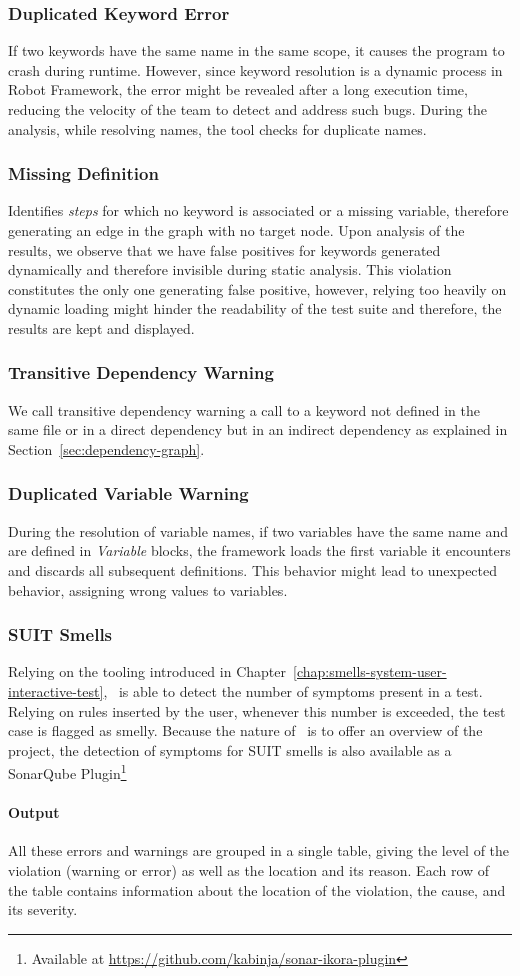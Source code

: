 \subsubsection{Duplicated Keyword Error} If two keywords have the same name in the same scope, it causes the program to crash during runtime. However, since keyword resolution is a dynamic process in Robot Framework, the error might be revealed after a long execution time, reducing the velocity of the team to detect and address such bugs. During the analysis, while resolving names, the tool checks for duplicate names.

\subsubsection{Missing Definition} Identifies \emph{steps} for which no keyword is associated or a missing variable, therefore generating an edge in the graph with no target node. Upon analysis of the results, we observe that we have false positives for keywords generated dynamically and therefore invisible during static analysis. This violation constitutes the only one generating false positive, however, relying too heavily on dynamic loading might hinder the readability of the test suite and therefore, the results are kept and displayed.

\subsubsection{Transitive Dependency Warning} We call transitive dependency warning a call to a keyword not defined in the same file or in a direct dependency but in an indirect dependency as explained in Section~\ref{sec:dependency-graph}.

\subsubsection{Duplicated Variable Warning} During the resolution of variable names, if two variables have the same name and are defined in \emph{Variable} blocks, the framework loads the first variable it encounters and discards all subsequent definitions. This behavior might lead to unexpected behavior, assigning wrong values to variables.

\subsubsection{SUIT Smells} Relying on the tooling introduced in Chapter~\ref{chap:smells-system-user-interactive-test}, \tool\ is able to detect the number of symptoms present in a test. Relying on rules inserted by the user, whenever this number is exceeded, the test case is flagged as smelly. Because the nature of \tool\ is to offer an overview of the project, the detection of symptoms for SUIT smells is also available as a SonarQube Plugin\footnote{Available at \url{https://github.com/kabinja/sonar-ikora-plugin}}

\paragraph{Output} All these errors and warnings are grouped in a single table, giving the level of the violation (warning or error) as well as the location and its reason. Each row of the table contains information about the location of the violation, the cause, and its severity.
